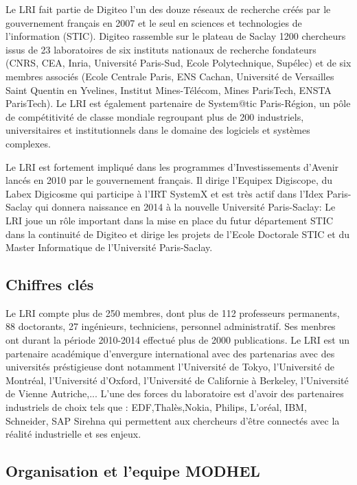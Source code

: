 Le LRI fait partie de Digiteo l'un des douze réseaux de recherche créés par le gouvernement français en 2007 et le seul en sciences et technologies de l'information (STIC). Digiteo rassemble sur le plateau de Saclay 1200 chercheurs issus de 23 laboratoires de six instituts nationaux de recherche fondateurs (CNRS, CEA, Inria, Université Paris-Sud, Ecole Polytechnique, Supélec) et de six membres associés (Ecole Centrale Paris, ENS Cachan, Université de Versailles Saint Quentin en Yvelines, Institut Mines-Télécom, Mines ParisTech, ENSTA ParisTech). Le LRI est également partenaire de System@tic Paris-Région, un pôle de compétitivité de classe mondiale regroupant plus de 200 industriels, universitaires et institutionnels dans le domaine des logiciels et systèmes complexes.

Le LRI est fortement impliqué dans les programmes d'Investissements d'Avenir lancés en 2010 par le gouvernement français. Il dirige l'Equipex Digiscope, du Labex Digicosme qui participe à l'IRT SystemX et est très actif dans l'Idex Paris-Saclay qui donnera naissance en 2014 à la nouvelle Université Paris-Saclay: Le LRI joue un rôle important dans la mise en place du futur département STIC dans la continuité de Digiteo et dirige les projets de l'Ecole Doctorale STIC et du Master Informatique de l'Université Paris-Saclay.

\subsection{Chiffres clés}

Le LRI compte plus de 250 membres, dont plus de 112 professeurs permanents, 88 doctorants, 27 ingénieurs, techniciens, personnel administratif. Ses menbres ont durant la période 2010-2014 effectué plus de 2000 publications. Le LRI est un partenaire académique d'envergure international avec des partenarias avec des universités préstigieuse dont notamment l'Université de Tokyo, l'Université de Montréal,  l'Université d'Oxford, l'Université de Californie à Berkeley, l'Université de Vienne Autriche,... L'une des forces du laboratoire est d'avoir des partenaires industriels de choix tels que :  EDF,Thalès,Nokia, Philips, L'oréal, IBM, Schneider, SAP Sirehna qui permettent aux chercheurs d'être connectés avec la réalité industrielle et ses enjeux. 


\subsection{Organisation et l'equipe MODHEL}

